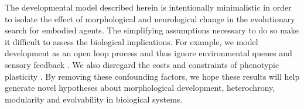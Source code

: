 The developmental model described herein is intentionally minimalistic in order to isolate the effect of morphological and neurological change in the evolutionary search for embodied agents.
The simplifying assumptions necessary to do so make it difficult to assess the biological implications.
For example, we model development as an open loop process 
and thus ignore environmental queues and sensory feedback 
\cite{Moczekrspb20110971,snell2013overview}.
We also disregard the costs and constraints of phenotypic plasticity 
\cite{snell2012selective,murren2015constraints}. 
By removing these confounding factors, we hope these results will help generate novel hypotheses about morphological development, heterochrony, modularity and evolvability in biological systems.

